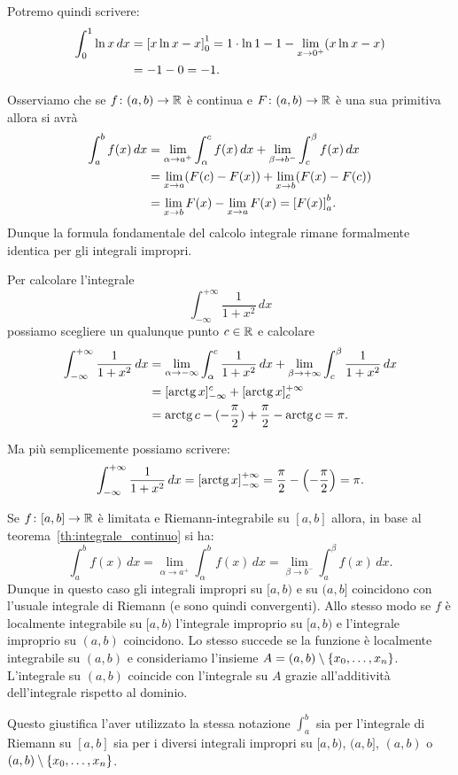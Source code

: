 Potremo quindi scrivere:
\begin{align*}
  \int_0^1 \ln x\, dx
  &= {\left[ x\ln x- x \right]}_0^1
  = 1 \cdot\ln 1 -1 - \lim_{x\to 0^+} (x\ln x - x) \\
  &= -1  - 0 = -1.
\end{align*}

Osserviamo che se $f\colon(a,b) \to {\mathbb R}$ è continua e $F\colon(a,b)\to {\mathbb R}$
è una sua primitiva
allora si avrà
\begin{align*}
  \int_a^b f(x)\, dx
   &= \lim_{\alpha\to a^+}\int_{\alpha}^c f(x)\, dx
   + \lim_{\beta\to b^-}\int_c^{\beta} f(x)\, dx \\
   & = \lim_{x\to a} (F(c)-F(x)) + \lim_{x\to b} (F(x)-F(c)) \\
   & = \lim_{x\to b} F(x) - \lim_{x\to a} F(x)
   = {\left[ F(x) \right]}_a^b.
\end{align*}
Dunque la formula fondamentale del calcolo integrale rimane formalmente identica
per gli integrali impropri.

\begin{example}
Per calcolare l'integrale
\[
  \int_{-\infty}^{+\infty} \frac{1}{1+x^2}\, dx
\]
possiamo scegliere un qualunque punto $c\in {\mathbb R}$ e calcolare
\begin{align*}
\int_{-\infty}^{+\infty}\frac{1}{1+x^2}\, dx
&=
\lim_{\alpha\to-\infty}\int_\alpha^c \frac{1}{1+x^2}\, dx
  + \lim_{\beta\to+\infty}\int_c^\beta \frac{1}{1+x^2}\, dx\\
  &= [\operatorname{arctg} x]_{-\infty}^c
  + [\operatorname{arctg} x]_c^{+\infty}  \\
  &= \operatorname{arctg} c - (-\frac\pi 2) + \frac \pi 2 - \operatorname{arctg} c
  = \pi.
\end{align*}

Ma più semplicemente possiamo scrivere:
\[
 \int_{-\infty}^{+\infty}\frac{1}{1+x^2}\, dx
 = {\left[ \operatorname{arctg} x \right]}_{-\infty}^{+\infty}
 = \frac \pi 2 - {\left( -\frac \pi 2 \right)} = \pi.
 \]

\end{example}

\begin{remark}
Se $f\colon[a,b]\to{\mathbb R}$ è limitata e Riemann-integrabile su
$[a,b]$ allora,
in base al teorema~\ref{th:integrale_continuo}
si ha:
\[
 \int_a^b f(x)\, dx
  = \lim_{\alpha \to a^+} \int_\alpha^b f(x)\, dx
  = \lim_{\beta\to b^-}\int_a^\beta f(x)\,dx.
\]
Dunque in questo caso gli integrali impropri su $[a,b)$ e su $(a,b]$ coincidono
con l'usuale integrale di Riemann (e sono quindi convergenti).
Allo stesso modo se $f$ è localmente integrabile su $[a,b)$
l'integrale improprio su $[a,b)$ e l'integrale improprio su
$(a,b)$ coincidono.
Lo stesso succede se la funzione è localmente integrabile
su $(a,b)$ e consideriamo l'insieme $A=(a,b)\setminus{\left\{ x_0,\dots,x_n \right\}}$.
L'integrale su $(a,b)$ coincide con l'integrale su $A$ grazie all'additività
dell'integrale rispetto al dominio.

Questo giustifica l'aver utilizzato la stessa notazione $\int_a^b$ sia per l'integrale
di Riemann su $[a,b]$ sia per i diversi integrali impropri su $[a,b)$, $(a,b]$,
$(a,b)$ o $(a,b)\setminus{\left\{ x_0, \dots, x_n \right\}}$.
\end{remark}

